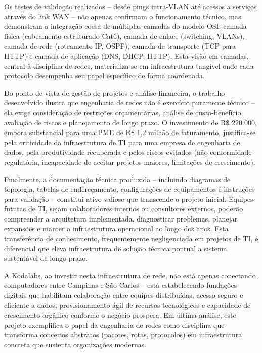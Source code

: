 \documentclass[12pt,a4paper]{article}
\begin{document}
Os testes de validação realizados -- desde pings intra-VLAN até acessos a serviços através do link WAN -- não apenas confirmam o funcionamento técnico, mas demonstram a integração coesa de múltiplas camadas do modelo OSI: camada física (cabeamento estruturado Cat6), camada de enlace (switching, VLANs), camada de rede (roteamento IP, OSPF), camada de transporte (TCP para HTTP) e camada de aplicação (DNS, DHCP, HTTP). Esta visão em camadas, central à disciplina de redes, materializa-se em infraestrutura tangível onde cada protocolo desempenha seu papel específico de forma coordenada.

Do ponto de vista de gestão de projetos e análise financeira, o trabalho desenvolvido ilustra que engenharia de redes não é exercício puramente técnico -- ela exige consideração de restrições orçamentárias, análise de custo-benefício, avaliação de riscos e planejamento de longo prazo. O investimento de R\$ 220.000, embora substancial para uma PME de R\$ 1,2 milhão de faturamento, justifica-se pela criticidade da infraestrutura de TI para uma empresa de engenharia de dados, pela produtividade recuperada e pelos riscos evitados (não-conformidade regulatória, incapacidade de aceitar projetos maiores, limitações de crescimento).

Finalmente, a documentação técnica produzida -- incluindo diagramas de topologia, tabelas de endereçamento, configurações de equipamentos e instruções para validação -- constitui ativo valioso que transcende o projeto inicial. Equipes futuras de TI, sejam colaboradores internos ou consultores externos, poderão compreender a arquitetura implementada, diagnosticar problemas, planejar expansões e manter a infraestrutura operacional ao longo dos anos. Esta transferência de conhecimento, frequentemente negligenciada em projetos de TI, é diferencial que eleva infraestrutura de solução técnica pontual a sistema sustentável de longo prazo.

A Kodalabs, ao investir nesta infraestrutura de rede, não está apenas conectando computadores entre Campinas e São Carlos -- está estabelecendo fundações digitais que habilitam colaboração entre equipes distribuídas, acesso seguro e eficiente a dados, provisionamento ágil de recursos tecnológicos e capacidade de crescimento orgânico conforme o negócio prospera. Em última análise, este projeto exemplifica o papel da engenharia de redes como disciplina que transforma conceitos abstratos (pacotes, rotas, protocolos) em infraestrutura concreta que sustenta organizações modernas.
\end{document}
